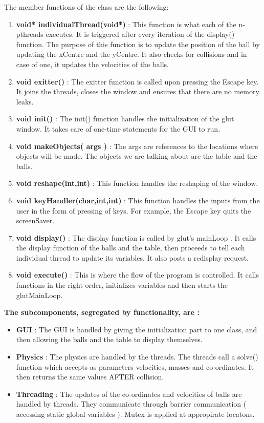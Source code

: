 \documentclass[]{article}
\begin{document}
\begin{itemize}
\begin{flushleft}
The member functions of the class are the following:
\begin{enumerate}
\item \textbf{ void* individualThread(void*)} : This function is what each of the n-pthreads executes. It is triggered after every iteration of the display() function. The purpose of this function is to update the position of the ball by updating the xCentre and the yCentre. It also checks for collisions and in case of one, it updates the velocities of the balls. 
\item \textbf{void exitter()} : The exitter function is called upon pressing the Escape key. It joins the threads, closes the window and ensures that there are no memory leaks.
\item \textbf{void init()} : The init() function handles the initialization of the glut window. It takes care of one-time statements for the GUI to run.
\item \textbf{void makeObjects( args )} : The args are references to the locations where objects will be made. The objects we are talking about are the table and the balls. 
\item \textbf{void reshape(int,int)} : This function handles the reshaping of the window.
\item \textbf{void keyHandler(char,int,int)} : This function handles the inputs from the user in the form of pressing of keys. For example, the Escape key quits the screenSaver.
\item \textbf{void display()} : The display function is called by glut's mainLoop . It calls the display function of the balls and the table, then proceeds to tell each individual thread to update its variables. It also posts a redisplay request.
\item \textbf{void execute()} : This is where the flow of the program is controlled. It calls functions in the right order, initializes variables and then starts the glutMainLoop.
\end{enumerate}

\textbf{The subcomponents, segregated by functionality, are :}
\begin{itemize}
\item \textbf{GUI} : The GUI is handled by giving the initialization part to one class, and then allowing the balls and the table to display themselves.
\item \textbf{Physics} : The physics are handled by the threads. The threads call a solve() function which accepts as parameters velocities, masses and co-ordinates. It then returns the same values AFTER collision.
\item \textbf{Threading} : The updates of the co-ordinates and velocities of balls are handled by threads. They communicate through barrier communication ( accessing static global variables ). Mutex is applied at appropirate locatons.
\end{itemize}
 
\end{flushleft}
\end{itemize}
\end{document}
